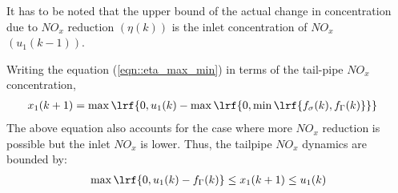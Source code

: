 It has to be noted that the upper bound of the actual change in concentration due to $NO_x$ reduction $(\eta(k))$ is the inlet concentration of $NO_x$ $(u_1(k-1))$.

Writing the equation (\ref{eqn::eta_max_min}) in terms of the tail-pipe $NO_x$ concentration,
\begin{align}
        x_1(k+1) &= \max \lrf{0, u_1(k) - \max \lrf{ 0, \min \lrf{f_{\sigma}(k), f_{\Gamma}(k)}}}
\end{align}
The above equation also accounts for the case where more $NO_x$ reduction is possible but the inlet $NO_x$ is lower.
Thus, the tailpipe $NO_x$ dynamics are bounded by:
\begin{align}
        \max \lrf{0, u_1(k) - f_{\Gamma}(k)} \leq x_1(k+1) \leq u_1(k)
\end{align}



